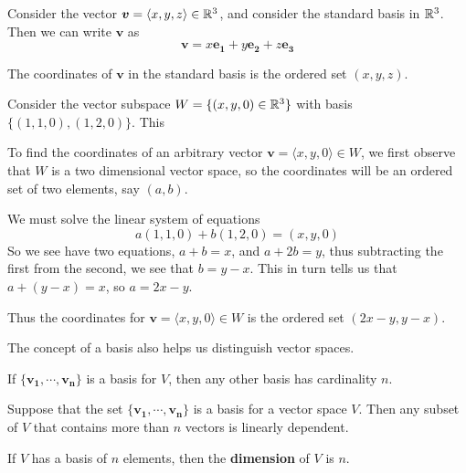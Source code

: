     \begin{example}
    Consider the vector $\bm{v} = \langle x, y,z \rangle \in \mathbb{R}^3$, and consider the standard basis in $\mathbb{R}^3$.  Then we can write $\bm{v}$ as
    $$\bm{v} = x\bm{e_1} + y\bm{e_2} + z\bm{e_3}$$
    
    The coordinates of $\bm{v}$ in the standard basis is the ordered set $(x,y,z)$.
    \end{example}
    
    \begin{example}
    Consider the vector subspace $W = \{(x, y, 0) \in \mathbb{R}^3 \}$ with basis $\{(1,1,0),(1,2,0)\}$.  This 
    
    To find the coordinates of an arbitrary vector $\bm{v} = \langle x, y,0 \rangle \in W$, we first observe that $W$ is a two dimensional vector space, so the coordinates will be an ordered set of two elements, say $(a,b)$.
    
    We must solve the linear system of equations $$a(1,1,0) + b(1,2,0) = (x,y,0)$$
    So we see have two equations, $a + b = x$, and $a+2b=y$, thus subtracting the first from the second, we see that $b = y-x$.  This in turn tells us that $a + (y-x) =x$, so $a = 2x-y$.
    
    Thus the coordinates for $\bm{v} = \langle x, y,0 \rangle \in W$ is the ordered set $(2x-y, y-x)$.
    \end{example}
    
    
    
    
    
    
    
    
    
    
    
    The concept of a basis also helps us distinguish vector spaces.
    
    \begin{theorem}\label{thm:basis}
    If $\{\bm{v_1}, \cdots, \bm{v_n}\}$ is a basis for $V$, then any other basis has cardinality $n$.
    \end{theorem}
    
    \begin{lemma}
    Suppose that the set $\{\bm{v_1}, \cdots, \bm{v_n}\}$ is a basis for a vector space $V$.  Then any subset of $V$ that contains more than $n$ vectors is linearly dependent.
    \end{lemma}
    
    
    \begin{definition}
    If $V$ has a basis of $n$ elements, then the \textbf{dimension} of $V$ is $n$.
    \end{definition}
    
